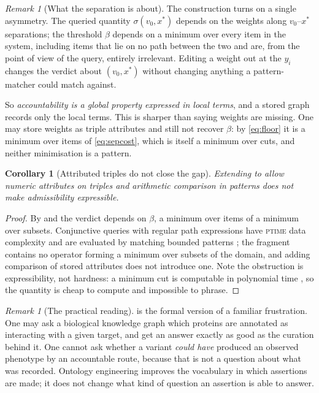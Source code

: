 \documentclass[11pt,twocolumn,a4paper]{article}
\theoremstyle{thmstyle}
\newtheorem{corollary}[theorem]{Corollary}
\theoremstyle{definition}
\theoremstyle{remark}
\newtheorem{remark}[theorem]{Remark}
\newcommand{\flo}{\beta}
\newcommand{\str}{\sigma}
\begin{document}
\begin{remark}[What the separation is about]
\label{rem:separation-meaning}
The construction turns on a single asymmetry. The queried quantity
$\str(v_0,x^{*})$ depends on the weights along $v_0$--$x^{*}$
separations; the threshold $\flo$ depends on a minimum over every item
in the system, including items that lie on no path between the two and
are, from the point of view of the query, entirely irrelevant. Editing
a weight out at the $y_i$ changes the verdict about $(v_0,x^{*})$
without changing anything a pattern-matcher could match against.

So \emph{accountability is a global property expressed in local terms},
and a stored graph records only the local terms. This is sharper than
saying weights are missing. One may store weights as triple attributes
and still not recover $\flo$: by \eqref{eq:floor} it is a minimum over
items of \eqref{eq:sepcost}, which is itself a minimum over cuts, and
neither minimisation is a pattern.
\end{remark}

\begin{corollary}[Attributed triples do not close the gap]
\label{cor:attributed}
Extending  to allow numeric attributes on triples
and arithmetic comparison in patterns does not make admissibility
expressible.
\end{corollary}

\begin{proof}
By  and  the
verdict depends on $\flo$, a minimum over items of a minimum over
subsets. Conjunctive queries with regular path expressions have
\textsc{ptime} data complexity and are evaluated by matching bounded
patterns \citep{perez2009,angles2017}; the fragment contains no
operator forming a minimum over subsets of the domain, and adding
comparison of stored attributes does not introduce one. Note the
obstruction is expressibility, not hardness: a minimum cut is
computable in polynomial time \citep{fordfulkerson1956,stoer1997}, so
the quantity is cheap to compute and impossible to phrase.
\end{proof}

\begin{remark}[The practical reading]
 is the formal version of a familiar frustration.
One may ask a biological knowledge graph
\citep{demir2010,callahan2020} which proteins are annotated as
interacting with a given target, and get an answer exactly as good as
the curation behind it. One cannot ask whether a variant \emph{could
have} produced an observed phenotype by an accountable route, because
that is not a question about what was recorded. Ontology engineering
\citep{smith2007,jupp2015,hastings2016} improves the vocabulary in
which assertions are made; it does not change what kind of question an
assertion is able to answer.
\end{remark}
\end{document}

